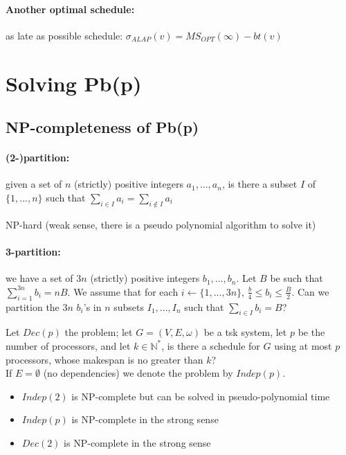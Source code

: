 \paragraph{Another optimal schedule:} as late as possible schedule: $\sigma_{ALAP}(v)=MS_{OPT}(\infty) - bt(v)$

\section{Solving Pb(p)}
\subsection{NP-completeness of Pb(p)}

\paragraph{(2-)partition:} given a set of $n$ (strictly) positive integers $a_1,...,a_n$, is there a subset $I$ of $\{1,...,n\}$ such that $\sum_{i\in I} a_i=\sum_{i\notin I}a_i$

NP-hard (weak sense, there is a pseudo polynomial algorithm to solve it)


\paragraph{3-partition:} we have a set of $3n$ (strictly) positive integers $b_1,...,b_n$. Let $B$ be such that $\sum_{i=1}^{3n}b_i=nB$. We assume that for each $i\leftarrow \{ 1,...,3n\}$, $\frac{b}{4}\leq b_i \leq \frac{B}{2}$. Can we partition the $3n$ $b_i$'s in $n$ subsets $I_1, ..., I_n$ such that $\sum_{i\in I} b_i = B$?

\begin{defi}
Let $Dec(p)$ the problem; let $G=(V,E,\omega)$ be a tsk system, let $p$ be the number of processors, and let $k\in \mathbb{N}^*$, is there a schedule for $G$ using at most $p$ processors, whose makespan is no greater than $k$?\\
If $E=\emptyset$ (no dependencies) we denote the problem by $Indep(p)$.
\end{defi}  

\begin{thm}
\begin{itemize}
\item $Indep(2)$ is NP-complete but can be solved in pseudo-polynomial time
\item $Indep(p)$ is NP-complete in the strong sense
\item $Dec(2)$ is NP-complete in the strong sense
\end{itemize}
\end{thm}


